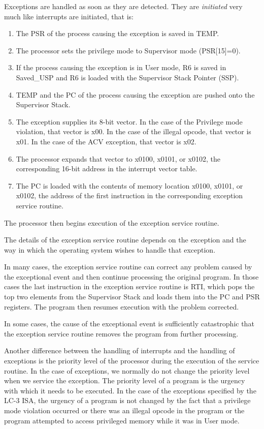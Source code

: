 \documentclass{patt}
\begin{document}
Exceptions are handled as soon as they are detected. They are {\em initiated}
very much like interrupts are initiated, that is:




\bgroup
\begin{enumerate}
\item
The PSR of the process causing the exception is saved in TEMP.
\item
The processor sets the privilege mode to Supervisor mode (PSR[15]=0).
\item
If the process causing the exception is in User mode, R6 is saved 
in Saved\_USP and R6 is loaded with the Supervisor Stack Pointer (SSP).
\item
TEMP and the PC of the process causing the exception are pushed onto the 
Supervisor Stack.
\item
The exception supplies its 8-bit vector. In the case of the Privilege mode 
violation, that vector is x00. In the case of the illegal opcode, that vector 
is x01.  In the case of the ACV exception, that vector is x02.
\item
The processor expands that vector to x0100, x0101, or x0102, the corresponding 
16-bit address in the interrupt vector table.
\item
The PC is loaded with the contents of memory location x0100, x0101, or x0102,
the address of the first instruction in the corresponding exception service
routine.
\end{enumerate}
\egroup

\noindent
The processor then begins execution of the exception service routine.

The details of the exception service routine depends on the
exception and the way in which the operating system wishes to handle
that exception.

In many cases, the exception service routine can
correct any problem caused by the exceptional event and then continue
processing the original program.
In those cases the last instruction in the exception service routine is RTI,
which pops the top two elements from the Supervisor Stack and loads them
into the PC and PSR registers. The program then resumes execution with
the problem corrected.

In some cases, the cause of the exceptional event is sufficiently catastrophic 
that the exception service routine removes the program from further processing.

Another difference between the handling of interrupts and the handling of
exceptions is the
priority level of the processor during the execution of the service routine.
In the case of exceptions, we normally do not change the priority level when
we service the exception. The priority level of a program is the urgency
with which it needs to be executed. In the case of the exceptions
specified by the LC-3 ISA, the urgency of a program is not changed by the
fact that a privilege mode violation occurred or there was an illegal opcode
in the program or the program attempted to access privileged memory while it
was in User mode.
\end{document}
